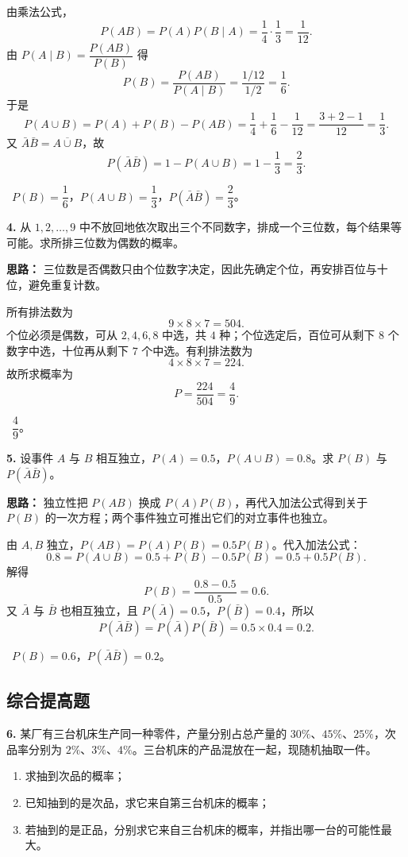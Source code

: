 由乘法公式，
\[
P(AB)=P(A)P(B\mid A)=\frac14\cdot\frac13=\frac1{12}.
\]
由 $P(A\mid B)=\dfrac{P(AB)}{P(B)}$ 得
\[
P(B)=\frac{P(AB)}{P(A\mid B)}=\frac{1/12}{1/2}=\frac16.
\]
于是
\[
P(A\cup B)=P(A)+P(B)-P(AB)
=\frac14+\frac16-\frac1{12}
=\frac{3+2-1}{12}=\frac13.
\]
又 $\bar A\bar B=\overline{A\cup B}$，故
\[
P(\bar A\bar B)=1-P(A\cup B)=1-\frac13=\frac23.
\]

\ $P(B)=\dfrac16$，$P(A\cup B)=\dfrac13$，$P(\bar A\bar B)=\dfrac23$。

\else \answerarea[8] \fi%

\textbf{4.} 从 $1,2,\ldots,9$ 中不放回地依次取出三个不同数字，排成一个三位数，每个结果等可能。求所排三位数为偶数的概率。

\ifshowsolutions%
\textbf{思路：} 三位数是否偶数只由个位数字决定，因此先确定个位，再安排百位与十位，避免重复计数。

所有排法数为
\[
9\times 8\times 7=504.
\]
个位必须是偶数，可从 $2,4,6,8$ 中选，共 $4$ 种；个位选定后，百位可从剩下 $8$ 个数字中选，十位再从剩下 $7$ 个中选。有利排法数为
\[
4\times 8\times 7=224.
\]
故所求概率为
\[
P=\frac{224}{504}=\frac49.
\]

\ $\dfrac49$。

\else \answerarea[8] \fi%

\textbf{5.} 设事件 $A$ 与 $B$ 相互独立，$P(A)=0.5$，$P(A\cup B)=0.8$。求 $P(B)$ 与 $P(\bar A\bar B)$。

\ifshowsolutions%
\textbf{思路：} 独立性把 $P(AB)$ 换成 $P(A)P(B)$，再代入加法公式得到关于 $P(B)$ 的一次方程；两个事件独立可推出它们的对立事件也独立。

由 $A,B$ 独立，$P(AB)=P(A)P(B)=0.5P(B)$。代入加法公式：
\[
0.8=P(A\cup B)=0.5+P(B)-0.5P(B)=0.5+0.5P(B).
\]
解得
\[
P(B)=\frac{0.8-0.5}{0.5}=0.6.
\]
又 $\bar A$ 与 $\bar B$ 也相互独立，且 $P(\bar A)=0.5$，$P(\bar B)=0.4$，所以
\[
P(\bar A\bar B)=P(\bar A)P(\bar B)=0.5\times 0.4=0.2.
\]

\ $P(B)=0.6$，$P(\bar A\bar B)=0.2$。

\else \answerarea[8] \fi%

\subsection{综合提高题}

\textbf{6.} 某厂有三台机床生产同一种零件，产量分别占总产量的 $30\%$、$45\%$、$25\%$，次品率分别为 $2\%$、$3\%$、$4\%$。三台机床的产品混放在一起，现随机抽取一件。
\begin{enumerate}[label=(\arabic*)]
    \item 求抽到次品的概率；
    \item 已知抽到的是次品，求它来自第三台机床的概率；
    \item 若抽到的是正品，分别求它来自三台机床的概率，并指出哪一台的可能性最大。
\end{enumerate}

